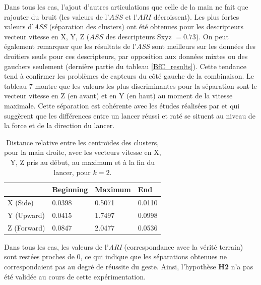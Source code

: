Dans tous les cas, l'ajout d'autres articulations que celle de la main ne fait que rajouter du bruit (les valeurs de l'$ASS$ et l'$ARI$ décroissent). Les plus fortes valeurs d'\textit{ASS} (séparation des clusters) ont été obtenues pour les descripteurs vecteur vitesse en X, Y, Z ($ASS$ des descripteurs Sxyz $= 0.73$). On peut également remarquer que les résultats de l'\textit{ASS} sont meilleurs sur les données des droitiers seuls pour ces descripteurs, par opposition aux données mixtes ou des gauchers seulement (dernière partie du tableau \ref{BfC_results}). Cette tendance tend à confirmer les problèmes de capteurs du côté gauche de la combinaison. Le tableau 7 montre que les valeurs les plus discriminantes pour la séparation sont le vecteur vitesse en Z (en avant) et en Y (en haut) au moment de la vitesse maximale. Cette séparation est cohérente avec les études réalisées par \parencite{Dekker2018BF} et \parencite{BFCAnalysis} qui suggèrent que les différences entre un lancer réussi et raté se situent au niveau de la force et de la direction du lancer.

\begin{table}[]
\centering
\begin{tabular}{|l|l|l|l|}
\hline
            & Beginning & Maximum & End    \\ \hline
X (Side)    & 0.0398    & 0.5071  & 0.0110 \\ \hline
Y (Upward)  & 0.0415    & \cellcolor{green!25} 1.7497  & 0.0998 \\ \hline
Z (Forward) & 0.0847    & \cellcolor{green!25} 2.0477  & 0.0536 \\ \hline
\end{tabular}
\label{BfC_best_descriptors}
\caption[Distance relative entre les centroïdes des clusters, pour la main droite, avec les vecteurs vitesse en X, Y, Z pour $k = 2$.]{Distance relative entre les centroïdes des clusters, pour la main droite, avec les vecteurs vitesse en X, Y, Z pris au début, au maximum et à la fin du lancer, pour $k = 2$.}
\end{table}

Dans tous les cas, les valeurs de l'\textit{ARI} (correspondance avec la vérité terrain) sont restées proches de 0, ce qui indique que les séparations obtenues ne correspondaient pas au degré de réussite du geste. Ainsi, l'hypothèse \textbf{H2} n'a pas été validée au cours de cette expérimentation.

